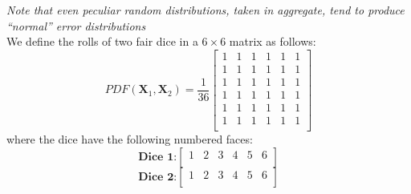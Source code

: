 \documentclass[12pt,letterpaper, onecolumn]{exam}
\begin{document}
\begin{questions}
    \textit{Note that even peculiar random distributions, taken in aggregate, tend to produce
        “normal” error distributions}
    \clearpage
    \\
    \solution
    We define the rolls of two fair dice in a $6 \times 6$ matrix as follows:
    \begin{equation}
        PDF(\mathbf{X}_1, \mathbf{X}_2) =
        \frac{1}{36}
        \begin{bmatrix}
            1 & 1 & 1 & 1 & 1 & 1 \\
            1 & 1 & 1 & 1 & 1 & 1 \\
            1 & 1 & 1 & 1 & 1 & 1 \\
            1 & 1 & 1 & 1 & 1 & 1 \\
            1 & 1 & 1 & 1 & 1 & 1 \\
            1 & 1 & 1 & 1 & 1 & 1 \\
        \end{bmatrix}
    \end{equation}
    where the dice have the following numbered faces:
    \[\textbf{Dice 1:}
        \begin{bmatrix}
            1 & 2 & 3 & 4 & 5 & 6 \\
        \end{bmatrix} \]
    \[\textbf{Dice 2:}
        \begin{bmatrix}
            1 & 2 & 3 & 4 & 5 & 6 \\
        \end{bmatrix} \]
    \begin{parts}

\end{parts}
\end{questions}
\end{document}
